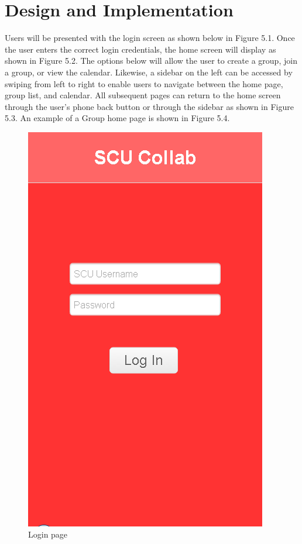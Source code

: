 \chapter{Design and Implementation}
Users will be presented with the login screen as shown below in Figure 5.1. Once the user enters the correct login credentials, the home screen will display as shown in Figure 5.2. The options below will allow the user to create a group, join a group, or view the calendar. Likewise, a sidebar on the left can be accessed by swiping from left to right to enable users to navigate between the home page, group list, and calendar. All subsequent pages can return to the home screen through the user’s phone back button or through the sidebar as shown in Figure 5.3. An example of a Group home page is shown in Figure 5.4.

\begin{figure}[h]
	\centering
	\includegraphics[scale=0.4]{images/login_screen.png}
	\caption{Login page}
	\label{fig:login screen}
\end{figure}

